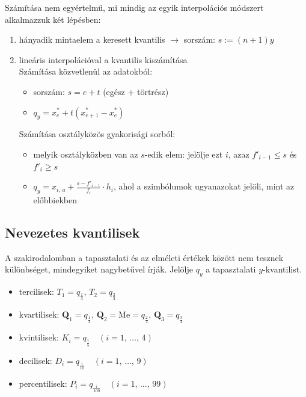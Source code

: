 \documentclass[12pt]{article}
\begin{document}
    Számítása nem egyértelmű, mi mindig az egyik interpolációs módszert alkalmazzuk két lépésben:
    \begin{enumerate}
        \item hányadik mintaelem a keresett kvantilis $\to$ sorszám: $s := (n+1)y$
        \item lineáris interpolációval a kvantilis kiszámítása\\
        Számítása közvetlenül az adatokból:
        \begin{itemize}
            \item sorszám: $s = e + t$ (egész + törtrész)
            \item $q_y = x_e^* + t(x_{e+1}^* - x_e^*)$
        \end{itemize}
        Számítása osztályközös gyakorisági sorból:
        \begin{itemize}
            \item melyik osztályközben van az $s$-edik elem: jelölje ezt $i$, azaz $f'_{i-1} \leq s$ és $f'_i \geq s$
            \item $\displaystyle q_y = x_{i, \, a} + \frac{s-f'_{i-1}}{f_i} \cdot h_i$, ahol a szimbólumok ugyanazokat jelöli, mint az előbbiekben
        \end{itemize}
    \end{enumerate}

    \subsection{Nevezetes kvantilisek}
    A szakirodalomban a tapasztalati és az elméleti értékek között nem tesznek különbséget, mindegyiket nagybetűvel írják. Jelölje $q_y$ a tapasztalati $y$-kvantilist.
    \begin{itemize}
        \item tercilisek: $T_1 = q_{\frac{1}{3}}, \, T_2 = q_{\frac{2}{3}}$
        \item kvartilisek: $\mathbf{Q}_1 = q_{\frac{1}{4}}$, $\mathbf{Q}_2 = \text{Me} = q_{\frac{2}{4}}$, $\mathbf{Q}_3 = q_\frac{3}{4}$
        \item kvintilisek: $K_i = q_\frac{i}{5} \quad (i = 1, \, \dots, \, 4)$ 
        \item decilisek: $D_i = q_\frac{i}{10} \quad (i = 1, \, \dots, \, 9)$
        \item percentilisek: $P_i = q_\frac{i}{100} \quad (i = 1, \, \dots, \, 99)$
    \end{itemize}
\end{document}
